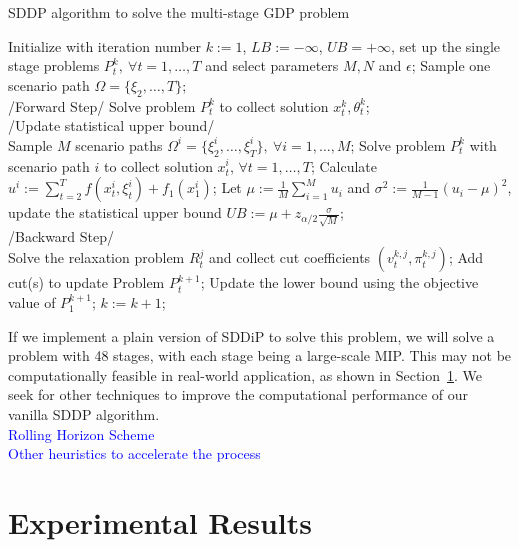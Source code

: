 \documentclass[12pt]{article}
\begin{document}
	\begin{algorithm}[H]
		\caption{SDDP algorithm to solve the multi-stage GDP problem}
		\label{alg:SDDP}
		\begin{algorithmic}[1]
			\State Initialize with iteration number \(k := 1\), \(LB := -\infty\), \(UB = +\infty\), set up the single stage problems \(P_t^k,\ \forall t = 1, \dots, T\) and select parameters \(M, N\) and \(\epsilon\);
			\State Sample one scenario path \(\Omega = \{\xi_2, \dots, T\}\); \\
			\State /Forward Step/
			\State Solve problem \(P_t^k\) to collect solution \(x_t^k, \theta_t^k\);
			\EndFor\\
			\State /Update statistical upper bound/\\
			\State Sample \(M\) scenario paths \(\Omega^i = \{\xi^i_2, \dots, \xi^i_T\}, \ \forall i = 1, \dots, M\);
			\State Solve problem \(P_t^k\) with scenario path \(i\) to collect solution \(x_t^i\), \(\forall t = 1, \dots, T\);
			\State Calculate \(u^i := \sum_{t = 2}^{T} f(x_t^i, \xi_t^i) + f_1(x_1^i)\);
			\EndFor
			\State Let \(\mu := \frac{1}{M} \sum_{i = 1}^{M} u_i\) and \(\sigma^2 := \frac{1}{M-1} (u_i - \mu)^2\), update the statistical upper bound \(UB := \mu + z_{\alpha/2}\frac{\sigma}{\sqrt{M}}\);
			\EndIf\\
			\State /Backward Step/\\
			\State Solve the relaxation problem \(R_t^j\) and collect cut coefficients \((v_t^{k,j}, \pi_t^{k,j})\);
			\EndFor
			\State Add cut(s) to update Problem \(P_t^{k+1}\);
			\EndFor
			\State Update the lower bound using the objective value of \(P_1^{k+1}\);
			\State \(k := k + 1\);
			\EndWhile
		\end{algorithmic}
	\end{algorithm}
	\noindent If we implement a plain version of SDDiP to solve this problem, we will solve a problem with 48 stages, with each stage being a large-scale MIP. This may not be computationally feasible in real-world application, as shown in Section~\ref{expResults}. We seek for other techniques to improve the computational performance of our vanilla SDDP algorithm.\\
	\newline
	\textcolor{blue}{Rolling Horizon Scheme}\\
	\textcolor{blue}{Other heuristics to accelerate the process}
\section{Experimental Results}\label{expResults}

\nocite{*}


\end{document}
